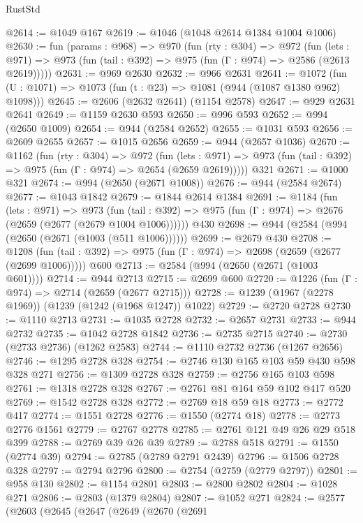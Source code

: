 \begin{lexlean}{RustStd}
\begin{coremodule}
{\begin{coremodule}
{{{{{{{{{{@2614 := @1049 @167
@2619 := @1046 (@1048 @2614 @1384 @1004 @1006)
@2630 := fun (params : @968) =>
  @970
    (fun (rty : @304) =>
    @972
      (fun (lets : @971) =>
      @973 (fun (tail : @392) => @975 (fun (Γ : @974) => @2586 (@2613 @2619)))))
@2631 := @969 @2630
@2632 := @966 @2631
@2641 := @1072 (fun (U : @1071) => @1073 (fun (t : @23) => @1081 (@944 (@1087 @1380 @962) @1098)))
@2645 := @2606 (@2632 @2641) (@1154 @2578)
@2647 := @929 @2631 @2641
@2649 := @1159 @2630 @593
@2650 := @996 @593
@2652 := @994 (@2650 @1009)
@2654 := @944 (@2584 @2652)
@2655 := @1031 @593
@2656 := @2609 @2655
@2657 := @1015 @2656
@2659 := @944 (@2657 @1036)
@2670 := @1162
    (fun (rty : @304) =>
    @972
      (fun (lets : @971) =>
      @973 (fun (tail : @392) => @975 (fun (Γ : @974) => @2654 (@2659 @2619)))))
    @321
@2671 := @1000 @321
@2674 := @994 (@2650 (@2671 @1008))
@2676 := @944 (@2584 @2674)
@2677 := @1043 @1842
@2679 := @1844 @2614 @1384
@2691 := @1184
    (fun (lets : @971) =>
    @973 (fun (tail : @392) => @975 (fun (Γ : @974) => @2676 (@2659 (@2677 (@2679 @1004 @1006))))))
    @430
@2698 := @944 (@2584 (@994 (@2650 (@2671 (@1003 (@511 @1006))))))
@2699 := @2679 @430
@2708 := @1208
    (fun (tail : @392) => @975 (fun (Γ : @974) => @2698 (@2659 (@2677 (@2699 @1006)))))
    @600
@2713 := @2584 (@994 (@2650 (@2671 (@1003 @601))))
@2714 := @944 @2713
@2715 := @2699 @600
@2720 := @1226 (fun (Γ : @974) => @2714 (@2659 (@2677 @2715)))
@2728 := @1239 (@1967 (@2278 @1969)) (@1239 (@1242 (@1968 @1247)) @1022)
@2729 := @2720 @2728
@2730 := @1110 @2713
@2731 := @1035 @2728
@2732 := @2657 @2731
@2733 := @944 @2732
@2735 := @1042 @2728 @1842
@2736 := @2735 @2715
@2740 := @2730 (@2733 @2736) (@1262 @2583)
@2744 := @1110 @2732 @2736 (@1267 @2656)
@2746 := @1295 @2728 @328
@2754 := @2746 @130 @165 @103 @59 @430 @598 @328 @271
@2756 := @1309 @2728 @328
@2759 := @2756 @165 @103 @598
@2761 := @1318 @2728 @328
@2767 := @2761 @81 @164 @59 @102 @417 @520
@2769 := @1542 @2728 @328
@2772 := @2769 @18 @59 @18
@2773 := @2772 @417
@2774 := @1551 @2728
@2776 := @1550 (@2774 @18)
@2778 := @2773 @2776 @1561
@2779 := @2767 @2778
@2785 := @2761 @121 @49 @26 @29 @518 @399
@2788 := @2769 @39 @26 @39
@2789 := @2788 @518
@2791 := @1550 (@2774 @39)
@2794 := @2785 (@2789 @2791 @2439)
@2796 := @1506 @2728 @328
@2797 := @2794 @2796
@2800 := @2754 (@2759 (@2779 @2797))
@2801 := @958 @130
@2802 := @1154 @2801
@2803 := @2800 @2802
@2804 := @1028 @271
@2806 := @2803 (@1379 @2804)
@2807 := @1052 @271
@2824 := @2577
    (@2603
      (@2645
        (@2647
          (@2649
            (@2670
              (@2691
}}}}}}}}}}
\end{coremodule}}
\end{coremodule}
\end{lexlean}
